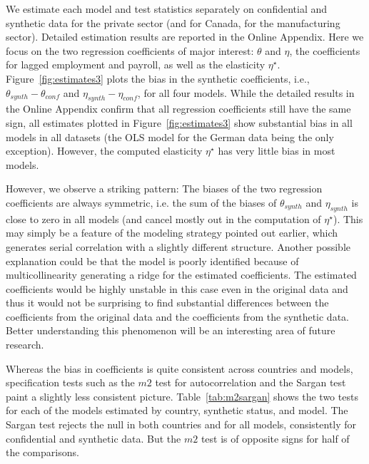 We estimate each model and test statistics separately on confidential and synthetic data for the private sector (and for Canada, for the manufacturing sector). Detailed estimation results are reported in the Online Appendix. Here we  focus on the two regression coefficients of major interest: $\theta$ and $\eta$, the coefficients for lagged employment and payroll, as well as the elasticity $\eta^\star$. Figure~\ref{fig:estimates3} plots the bias in the synthetic coefficients, i.e., $\theta_{synth}-\theta_{conf}$ and $\eta_{synth}-\eta_{conf}$, for all four models. While the detailed results in the Online Appendix confirm that all regression coefficients still have the same sign, all estimates plotted in Figure~\ref{fig:estimates3} show substantial bias in all models in all datasets (the OLS model for the German data being the only exception). However, the computed elasticity $\eta^\star$ has very little bias in most models.




However, we observe a striking pattern: The biases of the two regression coefficients are always symmetric, i.e. the sum of the biases of $\theta_{synth}$ and $\eta_{synth}$ is close to zero in all models (and cancel mostly out in the computation of $\eta^\star$). 
This may simply be a feature of the modeling strategy pointed out earlier, which generates serial correlation with a slightly different structure. Another possible explanation could be that the model is poorly identified because of multicollinearity generating a ridge for the estimated coefficients. The estimated coefficients would be highly unstable in this case even in the original data and thus it would not be surprising to find substantial differences between the coefficients from the original data and the coefficients from the synthetic data. Better understanding this phenomenon will be an interesting area of future research.




Whereas the bias in coefficients is quite consistent across countries and models, specification tests such as  the $m2$ test for autocorrelation and the Sargan test paint a slightly less consistent picture. Table~\ref{tab:m2sargan} shows the two tests for each of the models estimated by country, synthetic status, and model. The Sargan test rejects the null in both countries and for all models, consistently for confidential and synthetic data. But the $m2$ test is of opposite signs for half of the comparisons. 



